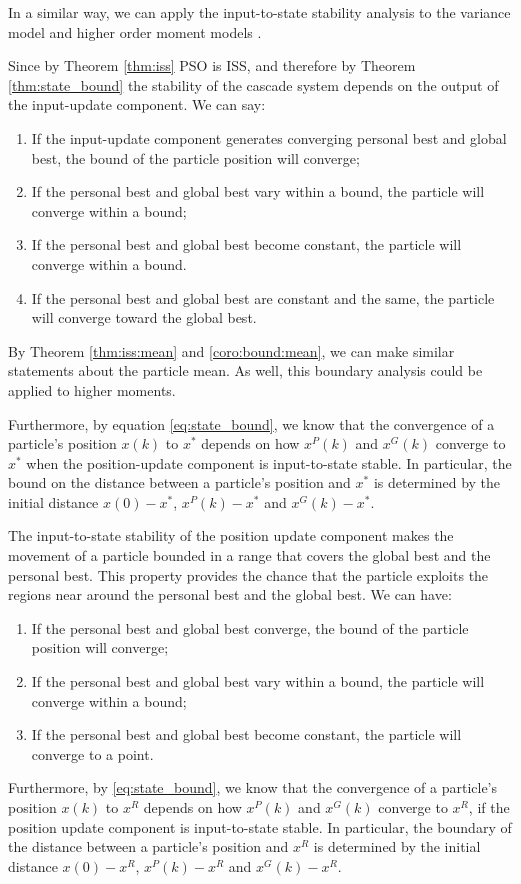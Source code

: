In a similar way, we can apply the input-to-state stability analysis to the variance model \cite{Jiang20078} and higher order moment models \cite{Poli:2007:EAS:1276958.1276977}.


Since by Theorem \ref{thm:iss} PSO is ISS, and therefore by Theorem \ref{thm:state_bound} the stability of the cascade system depends on the output of the input-update component. 
We can say:
\begin{enumerate}
\item If the input-update component generates converging personal best and global best, the bound of the particle position will converge;
\item If the personal best and global best vary within a bound, the particle will converge within a bound;
\item If the personal best and global best become constant, the particle will converge within a bound.
\item If the personal best and global best are constant and the same, the particle will converge toward the global best.
\end{enumerate}
By Theorem \ref{thm:iss:mean} and \ref{coro:bound:mean}, we can make similar statements about the particle mean.
As well, this boundary analysis could be applied to higher moments.

Furthermore, by equation \eqref{eq:state_bound}, we know that the convergence of a particle's position $ x(k) $ to $ x^{*} $ depends on how $ x^{P}(k) $ and $ x^{G}(k) $ converge to $ x^{*} $ when the position-update component is input-to-state stable.
In particular, the bound on the distance between a particle's position and  $ x^{*} $ is determined by the initial distance $ x(0) -  x^{*} $, $ x^{P}(k) -  x^{*} $ and $ x^{G}(k) -  x^{*} $.

The input-to-state stability of the position update component makes the movement of a particle bounded in a range that covers the global best and the personal best.
This property provides the chance that the particle exploits the regions near around the personal best and the global best.
We can have:
\begin{enumerate}
\item If the personal best and global best converge, the bound of the particle position will converge;
\item If the personal best and global best vary within a bound, the particle will converge within a bound;
\item If the personal best and global best become constant, the particle will converge to a point.
\end{enumerate}
Furthermore, by \eqref{eq:state_bound}, we know that the convergence of a particle's position $ x(k) $ to $ x^{R} $ depends on how $ x^{P}(k) $ and $ x^{G}(k) $ converge to $ x^{R} $, if the position update component is input-to-state stable.
In particular, the boundary of the distance between a particle's position and  $ x^{R} $ is determined by the initial distance $ x(0) -  x^{R} $, $ x^{P}(k) -  x^{R} $ and $ x^{G}(k) -  x^{R} $.

